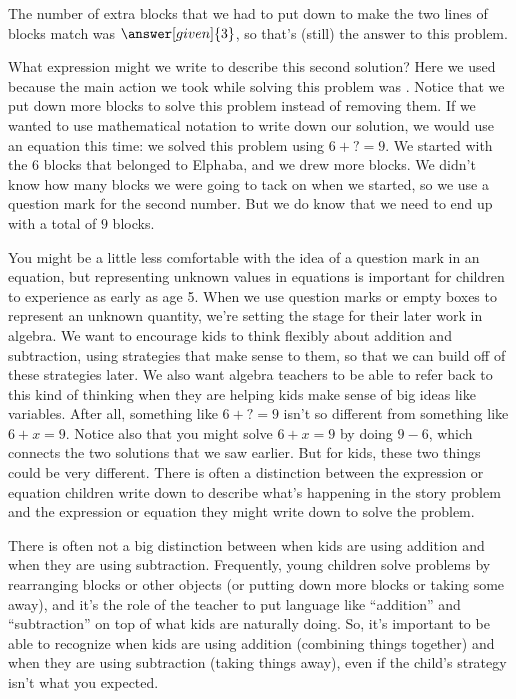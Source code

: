 \documentclass{ximera}
\begin{document}
\begin{example}
The number of extra blocks that we had to put down to make the two lines of blocks match was $\answer[given]{3}$, so that's (still) the answer to this problem.

What expression might we write to describe this second solution?  Here we used 
 because the main action we took while solving this 
problem was . Notice that we put down more blocks to solve this problem instead of removing them. If we wanted to use mathematical notation to write down our solution, we would use an equation this time: we solved this problem using $6 + ? = 9$. We started with the $6$ blocks that belonged to Elphaba, and we drew more blocks. We didn't know how many blocks we were going to tack on when we started, so we use a question mark for the second number. But we do know that we need to end up with a total of $9$ blocks.


\end{example} 

You might be a little less comfortable with the idea of a question mark in an equation, but representing unknown values 
in equations is important for children to experience as early as age 5. When we use question marks or empty boxes to 
represent an unknown quantity, we're setting the stage for their later work in algebra. We want to encourage kids to think 
flexibly about addition and subtraction, using strategies that make sense to them, so that we can build off of these 
strategies later. We also want algebra teachers to be able to refer back to this kind of thinking when they are helping 
kids make sense of big ideas like variables. After all, something like $6 + ? = 9$ isn't so different from something like $6 + x = 9$. Notice also that you might solve $6+x = 9$ by doing $9-6$, which connects the two solutions that we saw earlier. But for kids, these two things could be very different.  There is often a distinction between the expression or equation children write down to describe what's happening in the story problem and the expression or equation they might write down to solve the problem.

There is often not a big distinction between when kids are using addition and when they are using subtraction. Frequently, young children solve problems by rearranging blocks or other objects (or putting down more blocks or taking some away), and it's the role of the teacher to put language like ``addition'' and ``subtraction'' on top of what kids are naturally doing. So, it's important to be able to recognize when kids are using addition (combining things together) and when they are using subtraction (taking things away), even if the child's strategy isn't what you expected.
\end{document}
